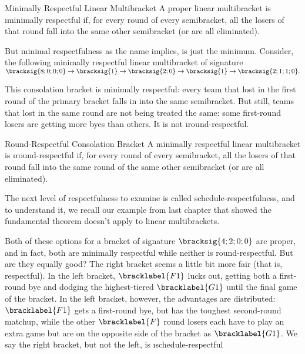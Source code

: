 {    \begin{definition}{Minimally Respectful Linear Multibracket}{}
        A proper linear multibracket is \i{minimally respectful} if, for every round of every semibracket, all the losers of that round fall into the same other semibracket (or are all eliminated).
    \end{definition}

    But minimal respectfulness as the name implies, is just the minimum. Consider, the following minimally respectful linear multibracket of signature $\bracksig{8;0;0;0} \to \bracksig{1}\to \bracksig{2;0} \to \bracksig{1} \to \bracksig{2;1;1;0}.$


    This consolation bracket is minimally respectful: every team that lost in the first round of the primary bracket falls in into the same semibracket. But still, teams that lost in the same round are not being treated the same: some first-round losers are getting more byes than others. It is not \i{round-respectful}.

    \begin{definition}{Round-Respectful Consolation Bracket}{}
        A minimally respectful linear multibracket is \i{round-respectful} if, for every round of every semibracket, all the losers of that round fall into the same round of the same other semibracket (or are all eliminated).
    \end{definition}

    The next level of respectfulness to examine is called schedule-respectfulness, and to understand it, we recall our example from last chapter that showed the fundamental theorem doesn't apply to linear multibrackets.


    Both of these options for a bracket of signature $\bracksig{4;2;0;0}$ are proper, and in fact, both are minimally respectful while neither is round-respectful. But are they equally good? The right bracket seems a little bit more fair (that is, respectful). In the left bracket, $\bracklabel{F1}$ lucks out, getting both a first-round bye and dodging the highest-tiered $\bracklabel{G1}$ until the final game of the bracket. In the left bracket, however, the advantages are distributed: $\bracklabel{F1}$ gets a first-round bye, but has the toughest second-round matchup, while the other $\bracklabel{F}$ round losers each have to play an extra game but are on the opposite side of the bracket as $\bracklabel{G1}$. We say the right bracket, but not the left, is \i{schedule-respectful}

}
